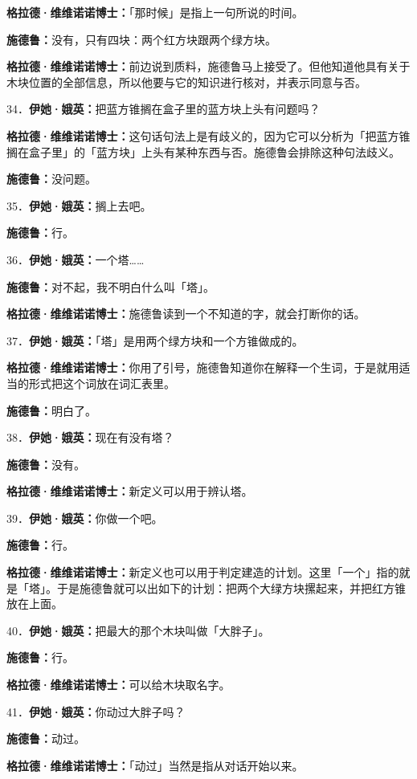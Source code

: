 \documentclass[
  12pt,
  twoside,
  openright,
  oldfontcommands,
]{memoir}
\newcommand{\dialogname}[1]{{\heifamily\bfseries #1}}
\begin{document}
\dialogname{格拉德·维维诺诺博士：}「那时候」是指上一句所说的时间。

\dialogname{施德鲁：}没有，只有四块：两个红方块跟两个绿方块。

\dialogname{格拉德·维维诺诺博士：}前边说到质料，施德鲁马上接受了。但他知道他具有关于木块位置的全部信息，所以他要与它的知识进行核对，并表示同意与否。

34．\dialogname{伊她·娥英：}把蓝方锥搁在盒子里的蓝方块上头有问题吗？

\dialogname{格拉德·维维诺诺博士：}这句话句法上是有歧义的，因为它可以分析为「把蓝方锥搁在盒子里」的「蓝方块」上头有某种东西与否。施德鲁会排除这种句法歧义。

\dialogname{施德鲁：}没问题。

35．\dialogname{伊她·娥英：}搁上去吧。

\dialogname{施德鲁：}行。

36．\dialogname{伊她·娥英：}一个塔\ldots\ldots{}

\dialogname{施德鲁：}对不起，我不明白什么叫「塔」。

\dialogname{格拉德·维维诺诺博士：}施德鲁读到一个不知道的字，就会打断你的话。

37．\dialogname{伊她·娥英：}「塔」是用两个绿方块和一个方锥做成的。

\dialogname{格拉德·维维诺诺博士：}你用了引号，施德鲁知道你在解释一个生词，于是就用适当的形式把这个词放在词汇表里。

\dialogname{施德鲁：}明白了。

38．\dialogname{伊她·娥英：}现在有没有塔？

\dialogname{施德鲁：}没有。

\dialogname{格拉德·维维诺诺博士：}新定义可以用于辨认塔。

39．\dialogname{伊她·娥英：}你做一个吧。

\dialogname{施德鲁：}行。

\dialogname{格拉德·维维诺诺博士：}新定义也可以用于判定建造的计划。这里「一个」指的就是「塔」。于是施德鲁就可以出如下的计划：把两个大绿方块摞起来，并把红方锥放在上面。

40．\dialogname{伊她·娥英：}把最大的那个木块叫做「大胖子」。

\dialogname{施德鲁：}行。

\dialogname{格拉德·维维诺诺博士：}可以给木块取名字。

41．\dialogname{伊她·娥英：}你动过大胖子吗？

\dialogname{施德鲁：}动过。

\dialogname{格拉德·维维诺诺博士：}「动过」当然是指从对话开始以来。
\end{document}
